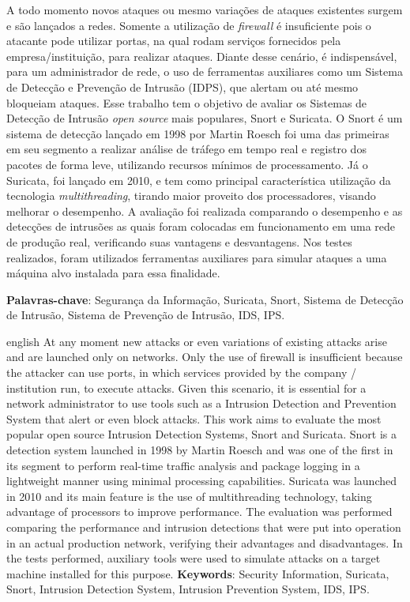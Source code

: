 \documentclass[
	12pt,				
	openright,		
	twoside,	
	a4paper,
	english,	
	brazil	
	]{abntex2}
\begin{document}
\begin{resumo}
 
    A todo momento novos ataques ou mesmo variações de ataques existentes surgem e são lançados a  redes. Somente a utilização de \textit{firewall} é insuficiente pois o atacante pode utilizar portas, na qual rodam serviços fornecidos pela empresa/instituição, para realizar ataques. Diante desse cenário, é indispensável, para um administrador de rede, o uso de ferramentas auxiliares como um Sistema de Detecção e Prevenção de Intrusão (IDPS), que alertam ou até mesmo bloqueiam ataques. Esse trabalho tem o objetivo de avaliar os Sistemas de Detecção de Intrusão \textit{open source} mais populares, Snort e Suricata. O Snort é um sistema de detecção lançado em 1998 por Martin Roesch foi uma das primeiras em seu segmento a realizar análise de tráfego em tempo real e registro dos pacotes de forma leve, utilizando recursos mínimos de processamento. Já o Suricata, foi lançado em 2010, e tem como principal característica utilização da tecnologia \textit{multithreading}, tirando maior proveito dos processadores, visando melhorar o desempenho. A avaliação foi realizada comparando o desempenho e as detecções de intrusões as quais foram colocadas em funcionamento em uma rede de produção real, verificando suas vantagens e desvantagens. Nos testes realizados, foram utilizados ferramentas auxiliares para simular ataques a uma máquina alvo instalada para essa finalidade. 

\textbf{Palavras-chave}: Segurança da Informação, Suricata, Snort, Sistema de Detecção de Intrusão, Sistema de Prevenção de Intrusão, IDS, IPS.
\end{resumo}
\begin{resumo}[Abstract]
 \begin{otherlanguage*}{english}
   \vspace{\onelineskip}
   \noindent 
   At any moment new attacks or even variations of existing attacks arise and are launched only on networks. Only the use of firewall is insufficient because the attacker can use ports, in which services provided by the company / institution run, to execute attacks. Given this scenario, it is essential for a network administrator to use tools such as a Intrusion Detection and Prevention System that alert or even block attacks. This work aims to evaluate the most popular open source Intrusion Detection Systems, Snort and Suricata. Snort is a detection system launched in 1998 by Martin Roesch and was one of the first in its segment to perform real-time traffic analysis and package logging in a lightweight manner using minimal processing capabilities. Suricata was launched in 2010 and its main feature is the use of multithreading technology, taking advantage of processors to improve performance. The evaluation was performed comparing the performance and intrusion detections that were put into operation in an actual production network, verifying their advantages and disadvantages. In the tests performed, auxiliary tools were used to simulate attacks on a target machine installed for this purpose.
   \textbf{Keywords}: Security Information, Suricata, Snort, Intrusion Detection System, Intrusion Prevention System, IDS, IPS.
 \end{otherlanguage*}
\end{resumo}
\end{document}
